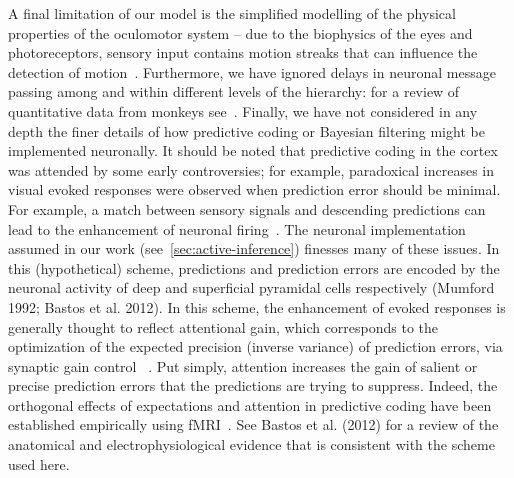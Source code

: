 \documentclass[a4paper]{article} %
\begin{document}
A final limitation of our model is the simplified modelling of the
physical properties of the oculomotor system -- due to the biophysics of
the eyes and photoreceptors, sensory input contains motion streaks that
can influence the detection of motion~\citep{Barlow04}.
Furthermore, we have ignored delays in neuronal message passing among
and within different levels of the hierarchy: for a review of
quantitative data from monkeys see~\citep{Salin95}. %
Finally, we have not considered in any depth the finer details of how predictive coding or Bayesian filtering might be implemented neuronally. It should be noted that predictive coding in the cortex was attended by some early controversies; for example, paradoxical increases in visual evoked responses were observed when prediction error should be minimal. For example, a match between sensory signals and descending predictions can lead to the enhancement of neuronal firing~\citep{Roelfsema98}. The neuronal implementation assumed in our work (see~\ref{sec:active-inference}) finesses many of these issues. In this (hypothetical) scheme, predictions and prediction errors are encoded by the neuronal activity of deep and superficial pyramidal cells respectively (Mumford 1992; Bastos et al. 2012). In this scheme, the enhancement of evoked responses is generally thought to reflect attentional gain, which corresponds to the optimization of the expected precision (inverse variance) of prediction errors, via synaptic gain control ~\citep{Feldman10a}. Put simply, attention increases the gain of salient or precise prediction errors that the predictions are trying to suppress. Indeed, the orthogonal effects of expectations and attention in predictive coding have been established empirically using fMRI~\citep{Kok12}. See Bastos et al. (2012) for a review of the anatomical and electrophysiological evidence that is consistent with the scheme used here. %
%
\end{document}
